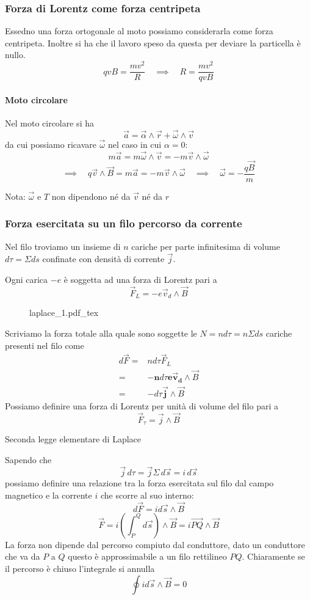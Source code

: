 \documentclass[x11names]{report}
\newcommand{\teorema}[2]{
	\begin{center}
		\fboxsep11pt
		\colorbox{myred}{\begin{minipage}{5.75in}
				\begin{redes}{#1}
					#2
				\end{redes}
		\end{minipage}}
	\end{center}
}
\newcommand{\nota}[2]{
	\begin{attenzione}{Nota:}
		#2
	\end{attenzione}
}
\newcommand{\incfig}[1]{%
	{#1.pdf_tex}
}
\begin{document}
\subsubsection{Forza di Lorentz come forza centripeta}
Essedno una forza ortogonale al moto possiamo considerarla come forza centripeta. Inoltre si ha che il lavoro speso da questa per deviare la particella è nullo.
\[
qvB = \frac{mv^2}{R} \quad \implies \quad R = \frac{mv^2}{qvB} 
\]
\paragraph{Moto circolare}
Nel moto circolare si ha
\[
\vec{a} = \vec{\alpha}\wedge\vec{r} + \vec{\omega}\wedge\vec{v}
\]
da cui possiamo ricavare \(\vec{\omega}\) nel caso in cui \(\alpha = 0\):
\[
m\vec{a} = m\vec{\omega}\wedge\vec{v} = - m\vec{v}\wedge\vec{\omega}
\]
\[
\implies \quad q\vec{v} \wedge \vec{B} = m\vec{a} = - m\vec{v}\wedge\vec{\omega} \quad \implies \quad \vec{\omega} = -\frac{q\vec{B}}{m}
\]
\nota{}{\(\vec{\omega}\) e \(T\) non dipendono né da \(\vec{v}\) né da \(r\)}

\subsubsection{Forza esercitata su un filo percorso da corrente}
Nel filo troviamo un insieme  di \(n\) cariche per parte infinitesima di volume \(d\tau = \Sigma ds\) confinate con densità di corrente \(\vec{j}\).

Ogni carica \(-e\) è soggetta ad una forza di Lorentz pari a 
\[
\vec{F}_L = -e\vec{v}_d \wedge \vec{B}
\] 
\begin{figure}[H]
	\centering
	\incfig{laplace_1}
\end{figure}
Scriviamo la forza totale alla quale sono soggette le \(N = nd\tau = n\Sigma ds\) cariche presenti nel filo come
\begin{align*}
	d\vec{F} =& n d\tau \vec{F}_L  \\
			 =& -\boldsymbol{n} d\tau \boldsymbol{e\vec{v}_d} \wedge \vec{B}  \\
			 =&  -d\tau \boldsymbol{\vec{j}}\wedge \vec{B}
\end{align*}
Possiamo definire una forza di Lorentz per unità di volume del filo pari a 
\[
\vec{F}_\tau = \vec{j}\wedge \vec{B}
\]
\teorema{Seconda legge elementare di Laplace}{
Sapendo che 
\[
\vec{j} \, d\tau = \vec{j}\Sigma \, d\vec{s} = i \, d\vec{s}
\]
possiamo definire una relazione tra la forza esercitata sul filo dal campo magnetico e la corrente \(i\) che scorre al suo interno:
\begin{equation}
	d\vec{F} = id\vec{s}\wedge \vec{B}
\end{equation}
\[
\vec{F} = i\left(\int_{P}^{Q}d\vec{s}\right)\wedge \vec{B} = i\vec{PQ}\wedge \vec{B}
\]
La forza non dipende dal percorso compiuto dal conduttore, dato un conduttore che va da \(P\) a \(Q\) questo è approssimabile a un filo rettilineo \(PQ\). Chiaramente se il percorso è chiuso l'integrale si annulla
\[
\oint id\vec{s}\wedge \vec{B} = 0
\]
}
\end{document}
